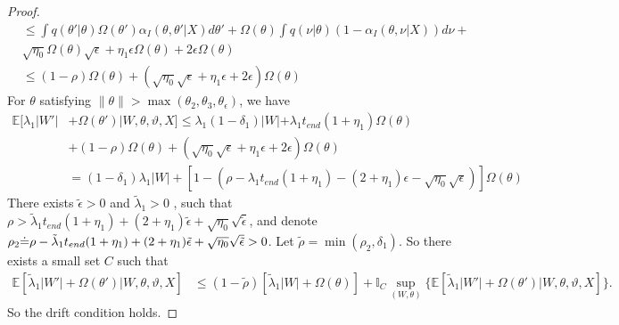 \begin{proof}
\begin{align*}
  & \leq \int q(\theta' | \theta) \Omega(\theta')\alpha_I(\theta, \theta'| X) d\theta'  + \Omega(\theta)\int  q(\nu | \theta) (1 - \alpha_I(\theta, \nu | X)) d\nu+ \\
  &\sqrt{\eta_0}\Omega(\theta) \sqrt{\epsilon} +  \eta_1 \epsilon \Omega(\theta) + 2\epsilon \Omega(\theta)\\
  & \leq (1 - \rho) \Omega(\theta) + (\sqrt{\eta_0} \sqrt{\epsilon} +  \eta_1 \epsilon + 2\epsilon) \Omega(\theta)
\end{align*}
For $\theta$ satisfying $ \| \theta \| >\max(\theta_2, \theta_3, \theta_\epsilon)$, we have %
\begin{align*}
\mathbb{E}[\lambda_1 | W'| &+ \Omega(\theta')| W, \theta, \vartheta, X] \le \lambda_1(1 - \delta_1)|W| + \lambda_1 t_{end} (1 + \eta_1)\Omega(\theta) \\
&+  (1 - \rho) \Omega(\theta) + (\sqrt{\eta_0} \sqrt{\epsilon} +  \eta_1 \epsilon + 2\epsilon) \Omega(\theta)\\
& = (1 - \delta_1)\lambda_1 |W| + [1 - (\rho - \lambda_1 t_{end} (1 + \eta_1) - (2 + \eta_1)\epsilon - \sqrt{\eta_0} \sqrt{\epsilon})]\Omega(\theta)
\end{align*}
There exists  $\tilde{\epsilon} > 0$ and $\tilde{\lambda}_1 >0 $ , such that $\rho >  \tilde{\lambda}_1 t_{end}  (1 + \eta_1) + (2 + \eta_1)\tilde{\epsilon} + \sqrt{\eta_0} \sqrt{\tilde{\epsilon}}$, and denote $\rho_2  {\doteq} \rho - \tilde{\lambda}_1 t_{end}  (1 + \eta_1) + (2 + \eta_1)\tilde{\epsilon} + \sqrt{\eta_0} \sqrt{\tilde{\epsilon}}
 > 0$. Let $\tilde{\rho} = \min(\rho_2, \delta_1)$. So there exists a small set $C$ such that \begin{align*}
\mathbb{E}[\tilde{\lambda}_1 | W'| + \Omega(\theta')| W, \theta, \vartheta, X] &\le (1 - \tilde{\rho}) [\tilde{\lambda}_1 | W| + \Omega(\theta)] +
\mathbb{I}_{C} \sup_{(W, \theta)} \{ \mathbb{E}[\tilde{\lambda}_1 | W'| + \Omega(\theta')| W, \theta, \vartheta, X] \}.
\end{align*}
So the drift condition holds.

\end{proof}
